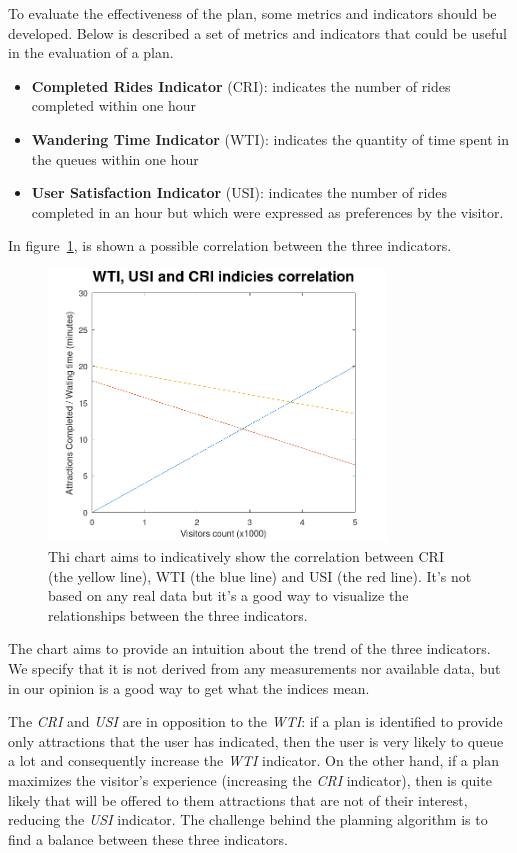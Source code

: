 To evaluate the effectiveness of the plan, some metrics and indicators should be developed. Below is described a set of metrics and indicators that
could be useful in the evaluation of a plan.

\begin{itemize}
	\item \textbf{Completed Rides Indicator} (CRI): indicates the number of rides completed within one hour
	\item \textbf{Wandering Time Indicator} (WTI): indicates the quantity of time spent in the queues within one hour
	\item \textbf{User Satisfaction Indicator} (USI): indicates the number of rides completed in an hour but which were expressed as preferences by the visitor.
\end{itemize}

In figure~\ref{fig:indicies}, is shown a possible correlation between the three indicators. 

\begin{figure}[H]
	\centering
	\includegraphics[width=0.8\textwidth]{img/indiciescorrelation.png}
	\caption{Thi chart aims to indicatively show the correlation between CRI (the yellow line), WTI (the blue line) and USI (the red line). It's not based on any real data but it's a good way to visualize the relationships between the three indicators.}
	\label{fig:indicies}
\end{figure}

The chart aims to provide an intuition about the trend of
the three indicators. We specify that it is not derived from any measurements nor available data, but in our opinion is a good way to get what the
indices mean.

The \textit{CRI} and \textit{USI} are in opposition to the \textit{WTI}: if a plan is identified to provide only attractions that the user has
indicated, then the user is very likely to queue a lot and consequently increase the \textit{WTI} indicator. On the other hand, if a plan maximizes
the visitor's experience (increasing the \textit{CRI} indicator), then is quite likely that will be offered to them attractions that are not of their
interest, reducing the \textit{USI} indicator. The challenge behind the planning algorithm is to find a balance between these three indicators.

